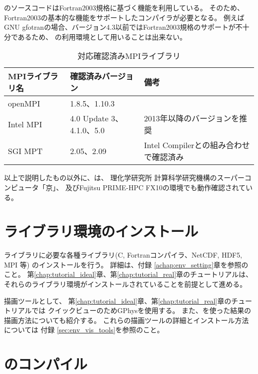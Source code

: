 \scalelib のソースコードはFortran2003規格に基づく機能を利用している。
そのため、Fortran2003の基本的な機能をサポートしたコンパイラが必要となる。
例えばGNU gfotranの場合、バージョン4.3以前ではFortran2003規格のサポートが不十分であるため、
\scalelib の利用環境として用いることは出来ない。

\begin{table}[htb]
\begin{center}
\caption{対応確認済みMPIライブラリ}
\begin{tabularx}{150mm}{|l|l|X|} \hline
 \rowcolor[gray]{0.9} MPIライブラリ名 & 確認済みバージョン & 備考 \\ \hline
 openMPI   & 1.8.5、1.10.3            & \\ \hline
 Intel MPI & 4.0 Update 3、4.1.0、5.0 & 2013年以降のバージョンを推奨 \\ \hline
 SGI MPT   & 2.05、2.09               & Intel Compilerとの組み合わせで確認済み \\ \hline
\end{tabularx}
\label{tab:compatible_mpi}
\end{center}
\end{table}

以上で説明したもの以外に、\scalelib は、
理化学研究所 計算科学研究機構のスーパーコンピュータ「京」、
及びFujitsu PRIME-HPC FX10の環境でも動作確認されている。


\section{ライブラリ環境のインストール} \label{sec:inst_env}
\scalelib ライブラリに必要な各種ライブラリ(C, Fortranコンパイラ、NetCDF, HDF5, MPI 等)
のインストールを行う。
詳細は、付録 \ref{achap:env_setting}章を参照のこと。
第\ref{chap:tutorial_ideal}章、第\ref{chap:tutorial_real}章のチュートリアルは、
それらのライブラリ環境がインストールされていることを前提として進める。

描画ツールとして、
第\ref{chap:tutorial_ideal}章、第\ref{chap:tutorial_real}章のチュートリアルでは
クイックビューのためGPhysを使用する。
また、\grads を使った結果の描画方法についても紹介する。
これらの描画ツールの詳細とインストール方法については
付録 \ref{sec:env_vis_tools}を参照のこと。



\section{\scalelib のコンパイル} \label{sec:scale_compile}

